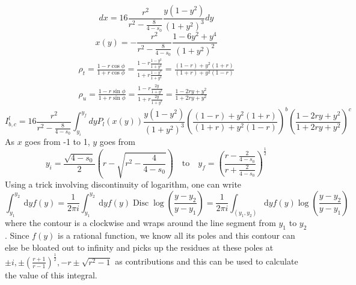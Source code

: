 ﻿\documentclass[12pt,a4paper]{article}
\begin{document}
$$
d x=16 \frac{r^{2}}{r^{2}-\frac{8}{4-s_{0}}} \frac{y\left(1-y^{2}\right)}{\left(1+y^{2}\right)^{3}} d y
$$
$$
x(y)=-\frac{r^{2}}{r^{2}-\frac{8}{4-s_{0}}} \frac{1-6 y^{2}+y^{4}}{\left(1+y^{2}\right)^{2}}
$$
$$
\begin{gathered}
\rho_{t}=\frac{1-r \cos \phi}{1+r \cos \phi}=\frac{1-r \frac{1-y^{2}}{1+y^{2}}}{1+r \frac{1-y^{2}}{1+y^{2}}}=\frac{(1-r)+y^{2}(1+r)}{(1+r)+y^{2}(1-r)} \\
\rho_{u}=\frac{1-r \sin \phi}{1+r \sin \phi}=\frac{1-r \frac{2 y}{1+y^{2}}}{1+r \frac{2 y}{1+y^{2}}}=\frac{1-2 r y+y^{2}}{1+2 r y+y^{2}}
\end{gathered}
$$
$$
I_{b, c}^{l}=16 \frac{r^{2}}{r^{2}-\frac{8}{4-s_{0}}} \int_{y_{i}}^{y_{f}} d y P_{l}(x(y)) \frac{y\left(1-y^{2}\right)}{\left(1+y^{2}\right)^{3}}\left(\frac{(1-r)+y^{2}(1+r)}{(1+r)+y^{2}(1-r)}\right)^{b}\left(\frac{1-2 r y+y^{2}}{1+2 r y+y^{2}}\right)^{c}
$$
As $x$ goes from -1 to 1, $y$ goes from 
$$
y_{i}=\frac{\sqrt{4-s_{0}}}{2}\left(r-\sqrt{r^{2}-\frac{4}{4-s_{0}}}\right)\quad \text{to} \quad y_{f}=\left(\frac{r-\frac{2}{4-s_{0}}}{r+\frac{2}{4-s_{0}}}\right)^{\frac{1}{2}}
$$
Using a trick involving discontinuity of logarithm, one can write
$$
\int_{y_{1}}^{y_{2}} \mathrm{~d} y f(y)=\frac{1}{2 \pi i} \int_{y_{1}}^{y_{2}} \mathrm{~d} y f(y) \operatorname{Disc} \log \left(\frac{y-y_{2}}{y-y_{1}}\right)=\frac{1}{2 \pi i} \int_{\left(y_{1}, y_{2}\right)} \mathrm{d} y f(y) \log \left(\frac{y-y_{2}}{y-y_{1}}\right)
$$
where the contour is a clockwise and wraps around the line segment from $y_{1}$ to $y_{2}$. Since $f(y)$ is a rational function, we know all its poles and this contour can else be bloated out to infinity and picks up the residues at these poles at $\pm i, \pm\left(\frac{r+1}{r-1}\right)^{\frac{1}{2}},-r \pm \sqrt{r^{2}-1}$ as contributions and this can be used to calculate the value of this integral.
\end{document}
